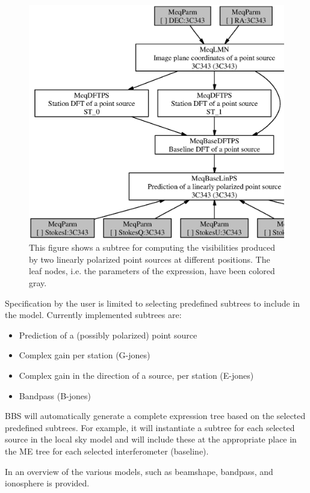 \documentclass[10pt]{lofar}
\begin{document}
\begin{figure}[htbp]
\centering
\includegraphics[width=\textwidth]{images/expr_graph_sdd.ps}
\caption{This figure shows a subtree for computing the visibilities produced by
two linearly polarized point sources at different positions. The leaf nodes,
i.e. the parameters of the expression, have been colored gray.}
\label{fig:expr_tree}
\end{figure}

Specification by the user is limited to selecting predefined subtrees to include
in the model. Currently implemented subtrees are:
\begin{itemize}
\item Prediction of a (possibly polarized) point source
\item Complex gain per station (G-jones)
\item Complex gain in the direction of a source, per station (E-jones)
\item Bandpass (B-jones)
\end{itemize}

BBS will automatically generate a complete expression tree based on the
selected predefined subtrees. For example, it will instantiate a subtree for
each selected source in the local sky model and will include these at the
appropriate place in the ME tree for each selected interferometer (baseline).

In \cite[sec. 2]{LOFAR-ASTRON-SDD-050}\cite{LOFAR-ASTRON-ADD-015} an overview of
the various models, such as beamshape, bandpass, and ionosphere is provided. 
\end{document}
